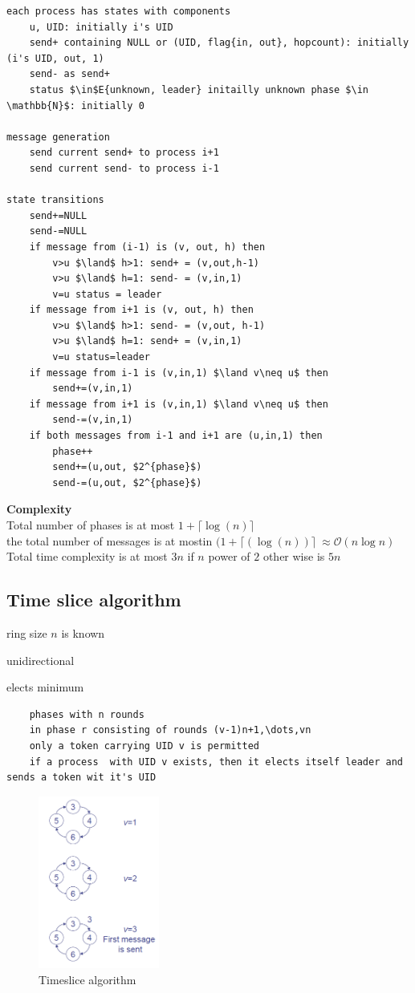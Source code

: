 \begin{lstlisting}
each process has states with components
	u, UID: initially i's UID
	send+ containing NULL or (UID, flag{in, out}, hopcount): initially (i's UID, out, 1)
	send- as send+
	status $\in$E{unknown, leader} initailly unknown phase $\in \mathbb{N}$: initially 0

message generation
	send current send+ to process i+1
	send current send- to process i-1

state transitions
	send+=NULL
	send-=NULL
	if message from (i-1) is (v, out, h) then
		v>u $\land$ h>1: send+ = (v,out,h-1)
		v>u $\land$ h=1: send- = (v,in,1)
		v=u status = leader
	if message from i+1 is (v, out, h) then
		v>u $\land$ h>1: send- = (v,out, h-1)
		v>u $\land$ h=1: send+ = (v,in,1)
		v=u status=leader
	if message from i-1 is (v,in,1) $\land v\neq u$ then
		send+=(v,in,1)
	if message from i+1 is (v,in,1) $\land v\neq u$ then
		send-=(v,in,1)
	if both messages from i-1 and i+1 are (u,in,1) then
		phase++
		send+=(u,out, $2^{phase}$)
		send-=(u,out, $2^{phase}$)
\end{lstlisting}
\textbf{Complexity}\\
Total number of phases is at most $1+\lceil\log(n)\rceil$\\
the total number of messages is at mostin $(1+\lceil(\log(n))\rceil\ \approx \mathcal{O}(n\log n)$\\
Total time complexity is at most $3n$ if $n$ power of $2$ other wise is $5n$\\

\subsection{Time slice algorithm}
\begin{compactitem}
\item ring size $n$ is known
\item unidirectional
\item elects minimum
\end{compactitem}


\begin{lstlisting}
	phases with n rounds
	in phase r consisting of rounds (v-1)n+1,\dots,vn
	only a token carrying UID v is permitted
	if a process  with UID v exists, then it elects itself leader and sends a token wit it's UID
\end{lstlisting}

\begin{figure}[h]
	\centering
	\includegraphics[width=150px]{gfx/timeslice.png}
	\caption{Timeslice algorithm}
	\label{img:timeslice}
\end{figure}

